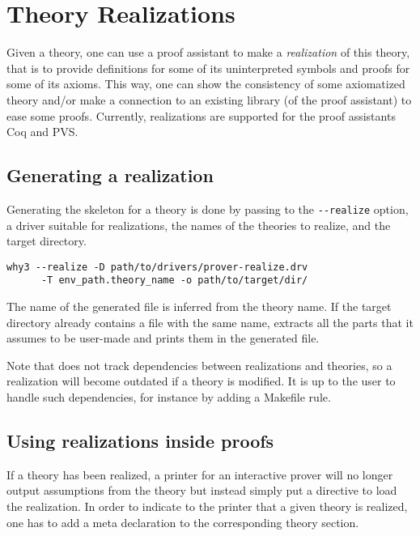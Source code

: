 \chapter{Theory Realizations}
\label{chap:realizations}

Given a \why theory, one can use a proof assistant to make a
\emph{realization} of this theory, that is to provide definitions for
some of its uninterpreted symbols and proofs for some of its
axioms. This way, one can show the consistency of some axiomatized
theory and/or make a connection to an existing library (of the proof
assistant) to ease some proofs.
Currently, realizations are supported for the proof assistants Coq and PVS.

\section{Generating a realization}

Generating the skeleton for a theory is done by passing to \why the
\verb+--realize+ option, a driver suitable for realizations, the names of
the theories to realize, and the target directory.

\begin{verbatim}
why3 --realize -D path/to/drivers/prover-realize.drv
      -T env_path.theory_name -o path/to/target/dir/
\end{verbatim}

The name of the generated file is inferred from the theory name. If the
target directory already contains a file with the same name, \why
extracts all the parts that it assumes to be user-made and prints them in
the generated file.

Note that \why does not track dependencies between realizations and
theories, so a realization will become outdated if a theory is modified.
It is up to the user to handle such dependencies, for instance by adding
a Makefile rule.

\section{Using realizations inside proofs}

If a theory has been realized, a \why printer for an interactive prover
will no longer output assumptions from the theory but instead simply put
a directive to load the realization. In order to indicate to the printer
that a given theory is realized, one has to add a meta declaration to the
corresponding theory section.

